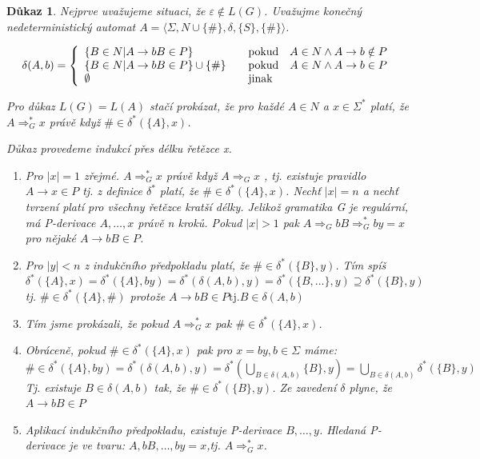 \documentclass[10pt, a4paper, titlepage]{article}
\theoremstyle{note}
\newtheorem{dukaz}{\textbf{Důkaz}}
\begin{document}
\begin{dukaz}
Nejprve uvažujeme situaci, že $\varepsilon \notin L(G)$. Uvažujme konečný nedeterministický automat $A = \langle \Sigma, N \cup \lbrace \# \rbrace, \delta, \lbrace S \rbrace,\lbrace \# \rbrace \rangle$.

$$
\delta(A,b)=\left\{
\begin{array}{l@{\quad\mbox{}\quad}l}
\lbrace B \in N | A \rightarrow bB \in P \rbrace & \text{pokud}\quad A \in N \wedge A \rightarrow b \notin P\\
\lbrace B \in N | A \rightarrow bB \in P \rbrace \cup \lbrace \# \rbrace & \text{pokud}\quad A \in N \wedge A \rightarrow b \in P\\
\emptyset & \text{jinak}\\
\end{array}
\right.
$$

Pro důkaz $L(G)=L(A)$ stačí prokázat, že pro každé $A \in N $  a $ x \in \Sigma^* $ platí, že $A \Rightarrow_G^* x$ právě když $ \# \in \delta^* (\lbrace A \rbrace,x)$.

Důkaz provedeme indukcí přes délku řetězce x. 
\begin{enumerate}
\item
Pro $|x|=1$ zřejmé. $A \Rightarrow_G^* x $ právě když $A \Rightarrow_G x $ , tj. existuje pravidlo $A \rightarrow x \in P$ tj. z definice $\delta^*$ platí, že $ \#\in \delta^* (\lbrace A \rbrace, x) $.
Nechť $|x|=n$ a nechť tvrzení platí pro všechny řetězce kratší délky. Jelikož gramatika G je regulární, má P-derivace $A,\ldots,x$ právě n kroků. Pokud $|x|>1$ pak $ A \Rightarrow_G bB \Rightarrow_G^* by = x $ pro nějaké $ A \rightarrow bB \in P$.

\item
Pro $|y|<n$ z indukčního předpokladu platí, že $\#\in \delta^* (\lbrace B \rbrace,y)$.
Tím spíš $\delta^* ( \lbrace A \rbrace, x ) = \delta^* ( \lbrace A \rbrace, by ) = \delta^* ( \delta( A , b ),y) = \delta^* ( \lbrace B,\ldots \rbrace, y ) \supseteq \delta^* ( \lbrace B \rbrace, y )$ tj. $ \# \in \delta^* (\lbrace A \rbrace,\#)$ protože $A \rightarrow bB \in P \text{tj.} B\in\delta (A,b)$

\item
Tím jsme prokázali, že pokud $A \Rightarrow^*_G x$ pak $\# \in \delta^* ( \lbrace A \rbrace , x )$.

\item
Obráceně, pokud $\#\in \delta^* ( \lbrace A \rbrace , x )$ pak pro $x=by, b\in \Sigma$ máme: $ \#\in \delta^* ( \lbrace A \rbrace , by ) = \delta^* ( \delta (A,b), y ) = \delta^* (\bigcup_{B\in\delta(A,b)}{\lbrace B \rbrace}, y) = \bigcup_{B\in\delta(A,b)}{\delta^* ( \lbrace B \rbrace , y)}$
Tj. existuje $ B \in \delta (A,b) $ tak, že $ \#\in\delta^* ( \lbrace B \rbrace ,y)$. Ze zavedení $\delta$ plyne, že $A \rightarrow bB \in P$

\item
Aplikací indukčního předpokladu, existuje P-derivace $B,\ldots,y$. Hledaná P-derivace je ve tvaru: $A,bB,\ldots,by=x$,tj. $A \Rightarrow^*_Gx$.
\end{enumerate}
\end{dukaz}
\end{document}
